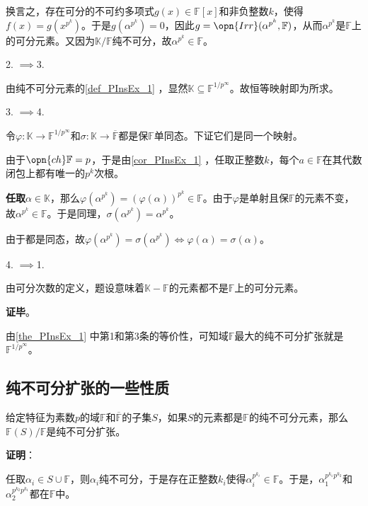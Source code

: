 换言之，存在可分的不可约多项式$g(x)\in\mathbb{F}[x]$和非负整数$k$，使得$f(x)=g(x^{p^k})$。于是$g(\alpha^{p^k})=0$，因此$g=\opn{Irr}(\alpha^{p^k}, \mathbb{F})$，从而$\alpha^{p^k}$是$\mathbb{F}$上的可分元素。又因为$\mathbb{K}/\mathbb{F}$纯不可分，故$\alpha^{p^k}\in\mathbb{F}$。


2. $\implies$3. 

由纯不可分元素的\autoref{def_PInsEx_1} ，显然$\mathbb{K}\subseteq\mathbb{F}^{1/p^\infty}$。故恒等映射即为所求。

3. $\implies$4. 

令$\varphi:\mathbb{K}\to\mathbb{F}^{1/p^\infty}$和$\sigma:\mathbb{K}\to\overline{\mathbb{F}}$都是保$\mathbb{F}$单同态。下证它们是同一个映射。

由于$\opn{ch}\mathbb{F}=p$，于是由\autoref{cor_PInsEx_1} ，任取正整数$k$，每个$a\in\mathbb{F}$在其代数闭包上都有唯一的$p^k$次根。

\textbf{任取}$\alpha\in\mathbb{K}$，那么$\varphi(\alpha^{p^k})=(\varphi(\alpha))^{p^k}\in\mathbb{F}$。由于$\varphi$是单射且保$\mathbb{F}$的元素不变，故$\alpha^{p^k}\in\mathbb{F}$。于是同理，$\sigma(\alpha^{p^k})=\alpha^{p^k}$。

由于都是同态，故$\varphi(\alpha^{p^k})=\sigma(\alpha^{p^k})\iff \varphi(\alpha)=\sigma(\alpha)$。

4. $\implies$1. 

由可分次数的定义，题设意味着$\mathbb{K}-\mathbb{F}$的元素都不是$\mathbb{F}$上的可分元素。


\textbf{证毕}。

由\autoref{the_PInsEx_1} 中第1和第3条的等价性，可知域$\mathbb{F}$最大的纯不可分扩张就是$\mathbb{F}^{1/p^\infty}$。





\subsection{纯不可分扩张的一些性质}


\begin{theorem}{}
给定特征为素数$p$的域$\mathbb{F}$和$\overline{\mathbb{F}}$的子集$S$，如果$S$的元素都是$\mathbb{F}$的纯不可分元素，那么$\mathbb{F}(S)/\mathbb{F}$是纯不可分扩张。
\end{theorem}

\textbf{证明}：

任取$\alpha_i\in S\cup\mathbb{F}$，则$\alpha_i$纯不可分，于是存在正整数$k_i$使得$\alpha_i^{p^{k_i}}\in\mathbb{F}$。于是，$\alpha_1^{p^{k_1}p^{k_2}}$和$\alpha_2^{p^{k_2}p^{k_1}}$都在$\mathbb{F}$中。

